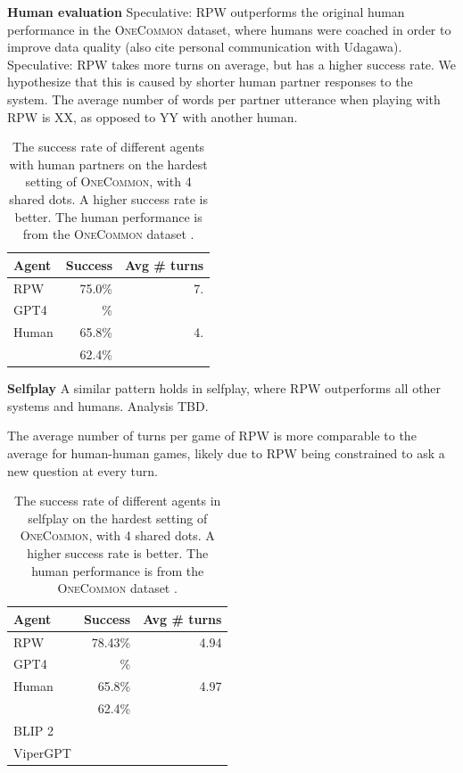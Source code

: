 \documentclass[11pt]{article}
\newcommand{\system}{RPW}
\begin{document}
\textbf{Human evaluation}
Speculative: \system{} outperforms the original human performance in
the \textsc{OneCommon} dataset,
where humans were coached in order to improve data quality \citep{onecommon}
(also cite personal communication with Udagawa).
Speculative: \system{} takes more turns on average, but
has a higher success rate.
We hypothesize that this is caused by shorter human partner
responses to the system.
The average number of words per partner utterance when playing with
\system{} is XX, as opposed to YY with another human.

\begin{table}[!t]
\centering
\begin{tabular}{lrr}
\toprule
Agent                   & Success & Avg \# turns\\
\midrule
\system{}               & 75.0\%        & 7.\\
GPT4                    & \%  & \\
Human                   & 65.8\%  & 4.\\
\citet{fried}           & 62.4\%  & \\
\bottomrule
\end{tabular}
\caption{\label{tbl:human-eval}
The success rate of different agents with human partners on the hardest setting of \textsc{OneCommon}, with 4 shared dots.
A higher success rate is better.
The human performance is from the \textsc{OneCommon} dataset
\citep{onecommon}.
}
\end{table}

\textbf{Selfplay}
A similar pattern holds in selfplay,
where \system{} outperforms all other systems and humans.
Analysis TBD.

The average number of turns per game of \system{} is more comparable 
to the average for human-human games, likely due to \system{}
being constrained to ask a new question at every turn.

\begin{table}[!t]
\centering
\begin{tabular}{lrr}
\toprule
Agent                   & Success & Avg \# turns\\
\midrule
\system{}               & 78.43\% & 4.94\\
GPT4                    & \%      & \\
Human                   & 65.8\%  & 4.97\\
\citet{fried}           & 62.4\%  & \\
BLIP 2                  &         & \\
ViperGPT                &         & \\
\bottomrule
\end{tabular}
\caption{\label{tbl:selfplay}
The success rate of different agents in selfplay on the hardest setting of \textsc{OneCommon}, with 4 shared dots.
A higher success rate is better.
The human performance is from the \textsc{OneCommon} dataset
\citep{onecommon}.
}
\end{table}
\end{document}
